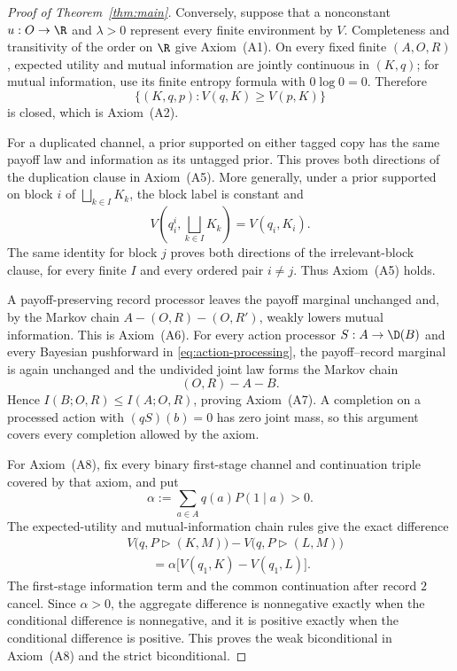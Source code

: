 \begin{proof}[Proof of Theorem~\ref{thm:main}]
Conversely, suppose that a nonconstant $u:O\to\R$ and $\lambda>0$ represent
every finite environment by $V$.  Completeness and transitivity of the order
on $\R$ give Axiom~\textup{(A1)}.  On every fixed finite
$(A,O,R)$, expected utility and mutual information are jointly continuous in
$(K,q)$; for mutual information, use its finite entropy formula with
$0\log0=0$.  Therefore
\[
\{(K,q,p):V(q,K)\ge V(p,K)\}
\]
is closed, which is Axiom~\textup{(A2)}.

For a duplicated channel, a prior supported on either tagged copy has the same
payoff law and information as its untagged prior.  This proves both directions
of the duplication clause in Axiom~\textup{(A5)}.  More generally, under a
prior supported on block $i$ of $\bigsqcup_{k\in I}K_k$, the block label is
constant and
\[
V\left(q_i^i,\bigsqcup_{k\in I}K_k\right)=V(q_i,K_i).
\]
The same identity for block $j$ proves both directions of the
irrelevant-block clause, for every finite $I$ and every ordered pair
$i\ne j$.  Thus Axiom~\textup{(A5)} holds.

A payoff-preserving record processor leaves the payoff marginal unchanged and,
by the Markov chain
$A-(O,R)-(O,R')$, weakly lowers mutual information.  This is
Axiom~\textup{(A6)}.  For every action processor $S:A\to\D(B)$ and every
Bayesian pushforward in \eqref{eq:action-processing}, the payoff--record
marginal is again unchanged and the undivided joint law forms the Markov chain
\[
(O,R)-A-B.
\]
Hence $I(B;O,R)\le I(A;O,R)$, proving Axiom~\textup{(A7)}.  A completion on a
processed action with $(qS)(b)=0$ has zero joint mass, so this argument covers
every completion allowed by the axiom.

For Axiom~\textup{(A8)}, fix every binary first-stage channel and continuation
triple covered by that axiom, and put
\[
\alpha:=\sum_{a\in A}q(a)P(1\mid a)>0.
\]
The expected-utility and mutual-information chain rules give the exact
difference
\begin{align*}
&V\bigl(q,P\triangleright(K,M)\bigr)
 -V\bigl(q,P\triangleright(L,M)\bigr)\\
&\qquad=\alpha\bigl[V(q_1,K)-V(q_1,L)\bigr].
\end{align*}
The first-stage information term and the common continuation after record $2$
cancel.  Since $\alpha>0$, the aggregate difference is nonnegative exactly
when the conditional difference is nonnegative, and it is positive exactly
when the conditional difference is positive.  This proves the weak
biconditional in Axiom~\textup{(A8)} and the strict biconditional.


\end{proof}
